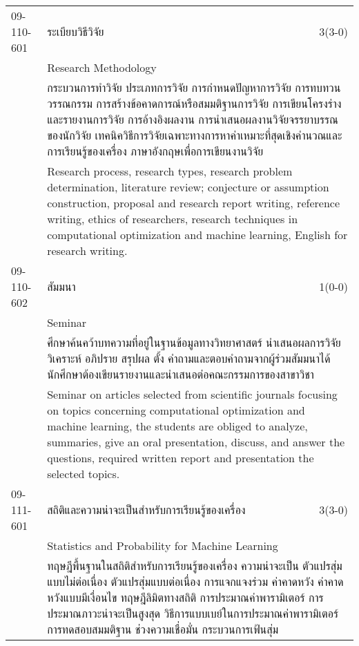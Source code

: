 \begin{longtable}{p{}p{}r{}}
09-110-601 & ระเบียบวิธีวิจัย & 3(3-0)\\*
 & Research Methodology & \phantom{x} \vspace{3mm} \\*
&  \multicolumn{2}{p{0.75\textwidth}}{กระบวนการทำวิจัย ประเภทการวิจัย การกำหนดปัญหาการวิจัย การทบทวนวรรณกรรม การสร้างข้อคาดการณ์หรือสมมติฐานการวิจัย การเขียนโครงร่างและรายงานการวิจัย การอ้างอิงผลงาน การนำเสนอผลงานวิจัยจรรยาบรรณของนักวิจัย เทคนิควิธีการวิจัยเฉพาะทางการหาค่าเหมาะที่สุดเชิงคำนวณและการเรียนรู้ของเครื่อง ภาษาอังกฤษเพื่อการเขียนงานวิจัย } \vspace{3mm} \\*
&  \multicolumn{2}{p{0.75\textwidth}}{Research process, research types, research problem determination, literature review; conjecture or assumption construction, proposal and research report writing, reference writing, ethics of researchers, research techniques in computational optimization and machine learning, English for research writing.} \vspace{8mm} \\*
09-110-602 & สัมมนา & 1(0-0)\\*
 & Seminar & \phantom{x} \vspace{3mm} \\*
&  \multicolumn{2}{p{0.75\textwidth}}{ศึกษาค้นคว้าบทความที่อยู่ในฐานข้อมูลทางวิทยาศาสตร์ นำเสนอผลการวิจัย วิเคราะห์ อภิปราย สรุปผล ตั้ง คำถามและตอบคำถามจากผู้ร่วมสัมมนาได้ นักศึกษาต้องเขียนรายงานและนำเสนอต่อคณะกรรมการของสาขาวิชา} \vspace{3mm} \\*
&  \multicolumn{2}{p{0.75\textwidth}}{Seminar on articles selected from scientific journals focusing on topics concerning computational optimization and machine learning, the students are obliged to analyze, summaries, give an oral presentation, discuss, and answer the questions, required written report and presentation the selected topics.} \vspace{8mm} \\*
09-111-601 & สถิติและความน่าจะเป็นสำหรับการเรียนรู้ของเครื่อง & 3(3-0)\\*
 & Statistics and Probability for Machine Learning & \phantom{x} \vspace{3mm} \\*
&  \multicolumn{2}{p{0.75\textwidth}}{ทฤษฎีพื้นฐานในสถิติสำหรับการเรียนรู้ของเครื่อง ความน่าจะเป็น ตัวแปรสุ่มแบบไม่ต่อเนื่อง ตัวแปรสุ่มแบบต่อเนื่อง การแจกแจงร่วม ค่าคาดหวัง ค่าคาดหวังแบบมีเงื่อนไข ทฤษฎีลิมิตทางสถิติ การประมาณค่าพารามิเตอร์ การประมาณภาวะน่าจะเป็นสูงสุด วิธีการแบบเบย์ในการประมาณค่าพารามิเตอร์ การทดสอบสมมติฐาน ช่วงความเชื่อมั่น กระบวนการเฟ้นสุ่ม} \vspace{3mm} \\*

\end{longtable}
